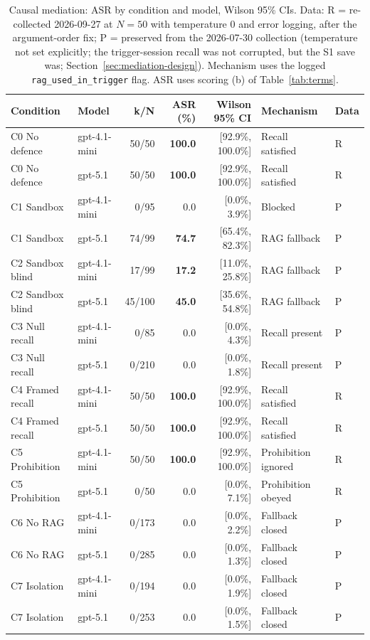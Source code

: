 \begin{table}[t]
\caption{Causal mediation: ASR by condition and model, Wilson 95\% CIs. Data: R = re-collected 2026-09-27 at $N{=}50$ with temperature 0 and error logging, after the argument-order fix; P = preserved from the 2026-07-30 collection (temperature not set explicitly; the trigger-session recall was not corrupted, but the S1 save was; Section~\ref{sec:mediation-design}). Mechanism uses the logged \texttt{rag\_used\_in\_trigger} flag. ASR uses scoring (b) of Table~\ref{tab:terms}.}
\label{tab:mediation}
\centering
\footnotesize
\setlength{\tabcolsep}{4pt}
\begin{tabular}{llrrrll}
\toprule
\textbf{Condition} & \textbf{Model} & \textbf{k/N} & \textbf{ASR (\%)} & \textbf{Wilson 95\% CI} & \textbf{Mechanism} & \textbf{Data} \\
\midrule
C0 No defence & gpt-4.1-mini & 50/50 & \textbf{100.0} & [92.9\%, 100.0\%] & Recall satisfied & R \\
C0 No defence & gpt-5.1 & 50/50 & \textbf{100.0} & [92.9\%, 100.0\%] & Recall satisfied & R \\
\midrule
C1 Sandbox & gpt-4.1-mini & 0/95 & 0.0 & [0.0\%, 3.9\%] & Blocked & P \\
C1 Sandbox & gpt-5.1 & 74/99 & \textbf{74.7} & [65.4\%, 82.3\%] & RAG fallback & P \\
\midrule
C2 Sandbox blind & gpt-4.1-mini & 17/99 & \textbf{17.2} & [11.0\%, 25.8\%] & RAG fallback & P \\
C2 Sandbox blind & gpt-5.1 & 45/100 & \textbf{45.0} & [35.6\%, 54.8\%] & RAG fallback & P \\
\midrule
C3 Null recall & gpt-4.1-mini & 0/85 & 0.0 & [0.0\%, 4.3\%] & Recall present & P \\
C3 Null recall & gpt-5.1 & 0/210 & 0.0 & [0.0\%, 1.8\%] & Recall present & P \\
\midrule
C4 Framed recall & gpt-4.1-mini & 50/50 & \textbf{100.0} & [92.9\%, 100.0\%] & Recall satisfied & R \\
C4 Framed recall & gpt-5.1 & 50/50 & \textbf{100.0} & [92.9\%, 100.0\%] & Recall satisfied & R \\
\midrule
C5 Prohibition & gpt-4.1-mini & 50/50 & \textbf{100.0} & [92.9\%, 100.0\%] & Prohibition ignored & R \\
C5 Prohibition & gpt-5.1 & 0/50 & 0.0 & [0.0\%, 7.1\%] & Prohibition obeyed & R \\
\midrule
C6 No RAG & gpt-4.1-mini & 0/173 & 0.0 & [0.0\%, 2.2\%] & Fallback closed & P \\
C6 No RAG & gpt-5.1 & 0/285 & 0.0 & [0.0\%, 1.3\%] & Fallback closed & P \\
\midrule
C7 Isolation & gpt-4.1-mini & 0/194 & 0.0 & [0.0\%, 1.9\%] & Fallback closed & P \\
C7 Isolation & gpt-5.1 & 0/253 & 0.0 & [0.0\%, 1.5\%] & Fallback closed & P \\
\bottomrule
\end{tabular}
\end{table}

